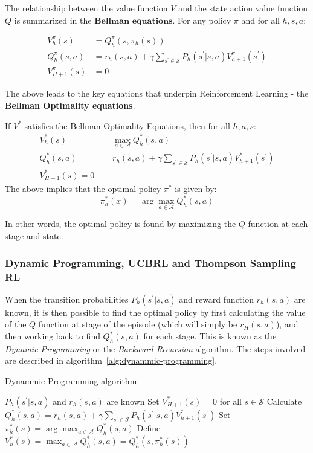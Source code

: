 \documentclass{mldsmsc}
\begin{document}
The relationship between the value function $V$ and the state action value function $Q$ is
summarized in the $\textbf{Bellman equations}$. For any policy $\pi$ and for all $h, s, a$:

\begin{align*}
    V_{h}^{\pi}(s) &= Q_{h}^{\pi}(s, \pi_{h}(s))\\
    Q_{h}^{\pi}(s,a) &= r_h(s,a) + \gamma \sum_{s^\prime \in \mathcal{S}} P_h (s^\prime | s, a)V_{h+1}^{\pi}(s^\prime)\\
    V_{H+1}^{\pi}(s) &= 0
\end{align*}

The above leads to the key equations that underpin Reinforcement Learning - the \textbf{Bellman Optimality equations}.

\begin{proposition}\label{prop:bellman-optimality}
    If $V^*$ satisfies the Bellman Optimality Equations, then for all $h, a, s$:
    \begin{align*}
        V_h^*(s) &= \max_{a \in \mathcal{A}}Q_{h}^*(s,a)\\
        Q_h^*(s,a) &= r_h(s,a) + \gamma \sum_{s^\prime \in \mathcal{S}} P_h (s^\prime | s, a)V_{h+1}^*(s^\prime)\\
        V_{H+1}^*(s) = 0
    \end{align*}
    The above implies that the optimal policy $\pi^*$ is given by:
    \[
    \pi_h^*(x) = \arg\max_{a \in \mathcal{A}} Q_h^*(s,a)
    \]
\end{proposition}

In other words, the optimal policy is found by maximizing the $Q$-function at each stage and
state.

\subsubsection{Dynamic Programming, UCBRL and Thompson Sampling RL}

When the transition probabilities $P_h(s^\prime|s,a)$ and reward function
$r_h(s,a)$ are known, it is then possible to find the optimal policy by first calculating the
value of the $Q$ function at stage of the episode (which will simply be $r_H(s,a)$), and then working
back to find $Q_h^*(s,a)$ for each stage. This is known as the \emph{Dynamic Programming} or 
the \emph{Backward Recursion} algorithm. The steps involved are described in algorithm~\ref{alg:dynammic-programming}.

\begin{algorithm}
    \caption{Dynammic Programming algorithm}\label{alg:dynammic-programming}
    \begin{algorithmic}[1]
        \Require $P_h(s^\prime|s,a)$ and $r_h(s,a)$ are known
        \State Set $V_{H+1}^*(s) = 0$ for all $s \in \mathcal{S}$
            \State Calculate $Q_h^*(s,a) = r_h(s,a) + \gamma \sum_{s^\prime \in \mathcal{S}}P_h(s^\prime |s,a) V_{h+1}^*(s^\prime)$
            \State Set $\pi_h^*(s) = \arg\max_{a \in \mathcal{A}} Q_h^*(s,a)$
            \State Define $V_h^*(s) = \max_{a \in \mathcal{A}}Q_h^*(s,a) = Q_h^*(s, \pi_h^*(s))$
        \EndFor
    \end{algorithmic}
\end{algorithm}
\end{document}
